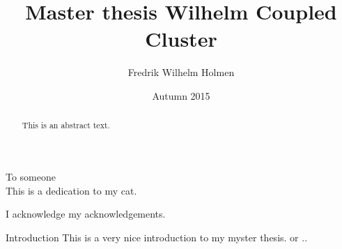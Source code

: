 \documentclass[twoside,english]{uiofysmaster}
\author{Fredrik Wilhelm Holmen}
\title{Master thesis Wilhelm Coupled Cluster}
\date{Autumn 2015}
\begin{document}
\setlength{\belowdisplayskip}{12pt} \setlength{\belowdisplayshortskip}{12pt}
\setlength{\abovedisplayskip}{12pt} \setlength{\abovedisplayshortskip}{12pt}


\maketitle

\begin{abstract}
  This is an abstract text.
\end{abstract}

\begin{dedication}
  To someone
  \\\vspace{12pt}
  This is a dedication to my cat.
\end{dedication}

\begin{acknowledgements}
  I acknowledge my acknowledgements.
\end{acknowledgements}

\tableofcontents



\begin{chapter}{Introduction}
  This is a very nice introduction to my myster thesis.
  or ..
\end{chapter}
\end{document}
